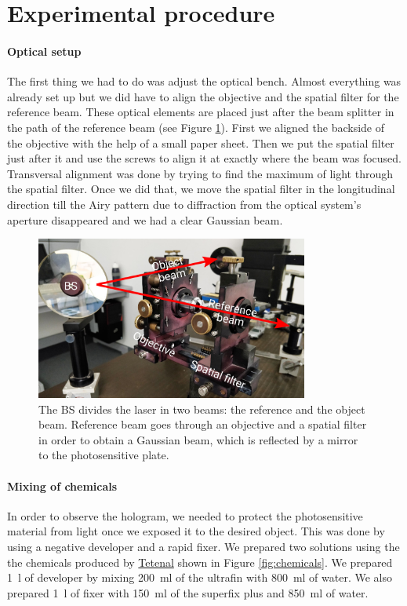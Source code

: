 \documentclass[11pt,a4paper]{article}
\begin{document}
\section{Experimental procedure}
\paragraph{Optical setup}
The first thing we had to do was adjust the optical bench. Almost everything was already set up but we did have to align the objective and the spatial filter for the reference beam. These optical elements are placed just after the beam splitter in the path of the reference beam (see Figure \ref{fig:optical_bench_1}). First we aligned the backside of the objective with the help of a small paper sheet. Then we put the spatial filter just after it and use the screws to align it at exactly where the beam was focused. Transversal alignment was done by trying to find the maximum of light through the spatial filter. Once we did that, we move the spatial filter in the longitudinal direction till the Airy pattern due to diffraction from the optical system's aperture disappeared and we had a clear Gaussian beam.

\begin{figure}[ht]
\centering
\includegraphics[width=0.8\textwidth]{Optical_bench_1}
\caption{The BS divides the laser in two beams: the reference and the object beam. Reference beam goes through an objective and a spatial filter in order to obtain a Gaussian beam, which is reflected by a mirror to the photosensitive plate.}
\label{fig:optical_bench_1}
\end{figure}

\paragraph{Mixing of chemicals}
In order to observe the hologram, we needed to protect the photosensitive material from light once we exposed it to the desired object. This was done by using a negative developer and a rapid fixer. We prepared two solutions using the the chemicals produced by \href{https://www.tetenal.com/}{Tetenal} shown in Figure \ref{fig:chemicals}. We prepared \SI{1}{\litre} of developer by mixing \SI{200}{\milli\litre} of the ultrafin with \SI{800}{\milli\litre} of water. We also prepared \SI{1}{\litre} of fixer with \SI{150}{\milli\litre} of the superfix plus and \SI{850}{\milli\litre} of water.
\end{document}
